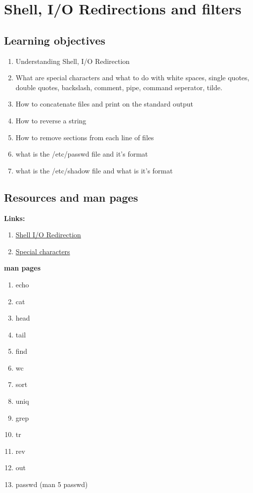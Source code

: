 \documentclass[12pt, letterpaper]{report}
\begin{document}
\chapter{Shell, I/O Redirections and filters}
\section{Learning objectives}
\begin{enumerate}
	\item Understanding Shell, I/O Redirection
	\item What are special characters and what to do with white spaces, single 
		quotes, double quotes, backslash, comment, pipe, command seperator, tilde.
	\item How to concatenate files and print on the standard output
	\item How to reverse a string
	\item How to remove sections from each line of files
	\item what is the /etc/passwd file and it's format
	\item what is the /etc/shadow file and what is it's format
\end{enumerate}

\section{Resources and man pages}
\textbf{Links:}
\begin{enumerate}
	\item \href{http://linuxcommand.org/lc3_lts0070.php}{Shell I/O Redirection}
	\item \href{http://mywiki.wooledge.org/BashGuide/SpecialCharacters}{Special characters}
\end{enumerate}

\textbf{man pages}
\begin{enumerate}
	\item echo
	\item cat
	\item head
	\item tail
	\item find
	\item wc
	\item sort
	\item uniq
	\item grep
	\item tr
	\item rev
	\item out
	\item passwd (man 5 passwd)
\end{enumerate}
\end{document}
